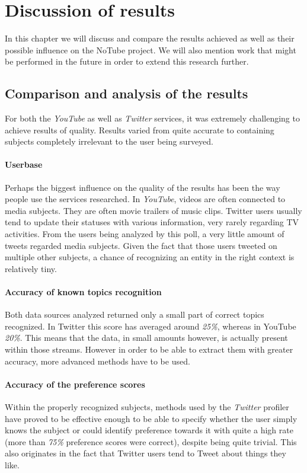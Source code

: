\section{Discussion of results}
In this chapter we will discuss and compare the results achieved as well as their possible influence on the NoTube project. We will also mention work that might be performed in the future in order to extend this research further.

\subsection{Comparison and analysis of the results}
For both the \textit{YouTube} as well as \textit{Twitter} services, it was extremely challenging to achieve results of
quality. Results varied from quite accurate to containing subjects completely irrelevant to the user being surveyed.

\paragraph{Userbase}
Perhaps the biggest influence on the quality of the results has been the way people use the services researched.
In \textit{YouTube}, videos are often connected to media subjects. They are
often movie trailers of music clips. Twitter users usually tend to update their statuses
with various information, very rarely regarding TV activities. From the users being analyzed by this poll, a very
little amount of tweets regarded media subjects. Given the fact that those users tweeted on multiple other subjects,
a chance of recognizing an entity in the right context is relatively tiny.

\paragraph{Accuracy of known topics recognition}
Both data sources analyzed returned only a small part of correct topics recognized. In Twitter this score has
averaged around \textit{25\%}, whereas in YouTube \textit{20\%}. This means that the data, in small amounts however, is actually present
within those streams. However in order to be able to extract them with greater accuracy, more advanced methods have
to be used.

\paragraph{Accuracy of the preference scores}
Within the properly recognized subjects, methods used by the \textit{Twitter} profiler have proved to be effective enough
to be able to specify whether the user simply knows the subject or could identify preference towards it with quite a high
rate (more than \textit{75\%} preference scores were correct), despite being quite trivial. This also originates in the fact
that Twitter users tend to Tweet about things they like.

